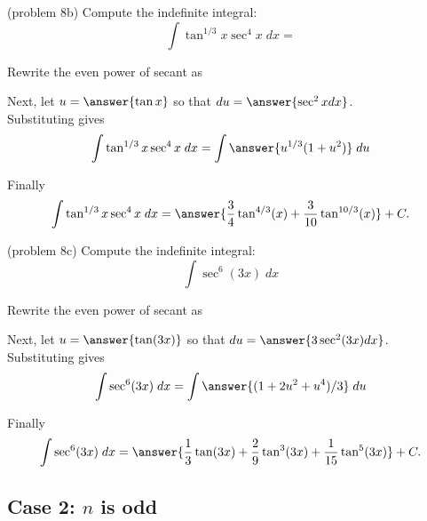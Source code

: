 \documentclass[handout]{ximera}
\begin{document}
\begin{problem}(problem 8b)
Compute the indefinite integral:
\[
\int \tan^{1/3} x \sec^4 x\;dx = 
\]

Rewrite the even power of secant as

\begin{multipleChoice}
\end{multipleChoice}

Next, let $u = \answer{\tan x}$ so that $du = \answer{\sec^2 x dx}$.\\

Substituting gives 
\[
\int \tan^{1/3} x\sec^4 x \; dx= \int \answer{u^{1/3}(1+u^2)} \; du
\]

Finally 
\[
\int \tan^{1/3} x\sec^4 x \; dx= \answer{\frac34 \tan^{4/3}(x) + \frac{3}{10} \tan^{10/3}(x)} + C.
\]

\end{problem}

\begin{problem}(problem 8c)
Compute the indefinite integral:
\[
\int  \sec^6(3x)\;dx
\]

Rewrite the even power of secant as

\begin{multipleChoice}
\end{multipleChoice}

Next, let $u = \answer{\tan(3x)}$ so that $du = \answer{3\sec^2(3x) dx}$.\\

Substituting gives 
\[
\int \sec^6(3x) \; dx= \int \answer{(1+ 2u^2 +u^4)/3} \; du
\]

Finally 
\[
\int \sec^6(3x) \; dx= \answer{\frac13 \tan(3x) + \frac29 \tan^3(3x) + \frac{1}{15}\tan^5(3x)} + C.
\]


\end{problem}




\subsection{Case 2: $n$ is odd}
\end{document}
